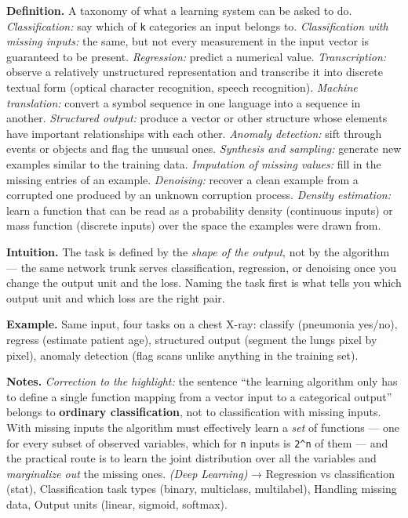 \documentclass[
  10pt,
  letterpaper,
  onecolumn]{article}
\begin{document}
\textbf{Definition.} A taxonomy of what a learning system can be asked
to do. \emph{Classification:} say which of \texttt{k} categories an
input belongs to. \emph{Classification with missing inputs:} the same,
but not every measurement in the input vector is guaranteed to be
present. \emph{Regression:} predict a numerical value.
\emph{Transcription:} observe a relatively unstructured representation
and transcribe it into discrete textual form (optical character
recognition, speech recognition). \emph{Machine translation:} convert a
symbol sequence in one language into a sequence in another.
\emph{Structured output:} produce a vector or other structure whose
elements have important relationships with each other.
\emph{Anomaly detection:} sift through events or objects and flag the
unusual ones. \emph{Synthesis and sampling:} generate new examples
similar to the training data. \emph{Imputation of missing values:} fill
in the missing entries of an example. \emph{Denoising:} recover a clean
example from a corrupted one produced by an unknown corruption process.
\emph{Density estimation:} learn a function that can be read as a
probability density (continuous inputs) or mass function (discrete
inputs) over the space the examples were drawn from.

\textbf{Intuition.} The task is defined by the \emph{shape of the
output}, not by the algorithm --- the same network trunk serves
classification, regression, or denoising once you change the output unit
and the loss. Naming the task first is what tells you which output unit
and which loss are the right pair.

\textbf{Example.} Same input, four tasks on a chest X-ray: classify
(pneumonia yes/no), regress (estimate patient age), structured output
(segment the lungs pixel by pixel), anomaly detection (flag scans unlike
anything in the training set).

\textbf{Notes.} \emph{Correction to the highlight:} the sentence ``the
learning algorithm only has to define a single function mapping from a
vector input to a categorical output'' belongs to \textbf{ordinary
classification}, not to classification with missing inputs. With missing
inputs the algorithm must effectively learn a \emph{set} of functions
--- one for every subset of observed variables, which for \texttt{n}
inputs is \texttt{2\^{}n} of them --- and the practical route is to
learn the joint distribution over all the variables and
\emph{marginalize out} the missing ones. \emph{(Deep Learning)} →
Regression vs classification (stat), Classification task types (binary,
multiclass, multilabel), Handling missing data, Output units (linear,
sigmoid, softmax).
\end{document}
